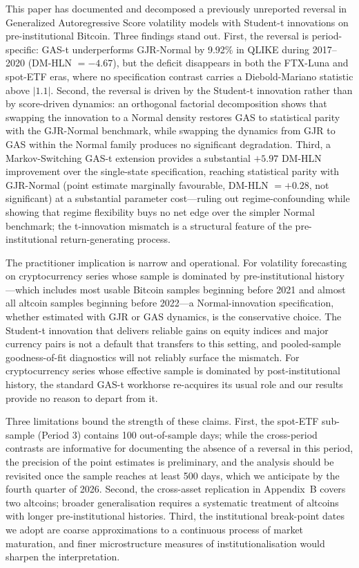 This paper has documented and decomposed a previously unreported reversal in Generalized Autoregressive Score volatility models with Student-t innovations on pre-institutional Bitcoin. Three findings stand out. First, the reversal is period-specific: GAS-t underperforms GJR-Normal by 9.92\% in QLIKE during 2017--2020 (DM-HLN $= -4.67$), but the deficit disappears in both the FTX-Luna and spot-ETF eras, where no specification contrast carries a Diebold-Mariano statistic above $|1.1|$. Second, the reversal is driven by the Student-t innovation rather than by score-driven dynamics: an orthogonal factorial decomposition shows that swapping the innovation to a Normal density restores GAS to statistical parity with the GJR-Normal benchmark, while swapping the dynamics from GJR to GAS within the Normal family produces no significant degradation. Third, a Markov-Switching GAS-t extension provides a substantial $+5.97$ DM-HLN improvement over the single-state specification, reaching statistical parity with GJR-Normal (point estimate marginally favourable, DM-HLN $= +0.28$, not significant) at a substantial parameter cost---ruling out regime-confounding while showing that regime flexibility buys no net edge over the simpler Normal benchmark; the t-innovation mismatch is a structural feature of the pre-institutional return-generating process.

The practitioner implication is narrow and operational. For volatility forecasting on cryptocurrency series whose sample is dominated by pre-institutional history---which includes most usable Bitcoin samples beginning before 2021 and almost all altcoin samples beginning before 2022---a Normal-innovation specification, whether estimated with GJR or GAS dynamics, is the conservative choice. The Student-t innovation that delivers reliable gains on equity indices and major currency pairs is not a default that transfers to this setting, and pooled-sample goodness-of-fit diagnostics will not reliably surface the mismatch. For cryptocurrency series whose effective sample is dominated by post-institutional history, the standard GAS-t workhorse re-acquires its usual role and our results provide no reason to depart from it.

Three limitations bound the strength of these claims. First, the spot-ETF sub-sample (Period 3) contains 100 out-of-sample days; while the cross-period contrasts are informative for documenting the absence of a reversal in this period, the precision of the point estimates is preliminary, and the analysis should be revisited once the sample reaches at least 500 days, which we anticipate by the fourth quarter of 2026. Second, the cross-asset replication in Appendix~B covers two altcoins; broader generalisation requires a systematic treatment of altcoins with longer pre-institutional histories. Third, the institutional break-point dates we adopt are coarse approximations to a continuous process of market maturation, and finer microstructure measures of institutionalisation would sharpen the interpretation.

